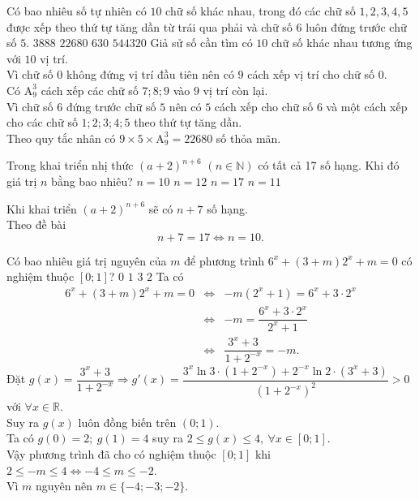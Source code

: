 \begin{ex}%
	Có bao nhiêu số tự nhiên có $10$ chữ số khác nhau, trong đó các chữ số $1,2,3,4,5$ được xếp theo thứ tự tăng dần từ trái qua phải và chữ số $6$ luôn đứng trước chữ số $5$.
	\choice
	{$3888$}
	{\True $22680$}
	{$630$}
	{$544320$}
	\loigiai
	{
		Giả sử số cần tìm có $10$ chữ số khác nhau tương ứng với $10$ vị trí.\\ Vì chữ số $0$ không đứng vị trí đầu tiên nên có $9$ cách xếp vị trí cho chữ số $0$.\\
		Có $\mathrm{A}_9^3$ cách xếp các chữ số $7;8;9$ vào $9$ vị trí còn lại.\\
		Vì chữ số $6$ đứng trước chữ số $5$ nên có $5$ cách xếp cho chữ số $6$ và một cách xếp cho các chữ số $1;2;3;4;5$ theo thứ tự tăng dần.\\
		Theo quy tắc nhân có $9\times5\times\mathrm{A}_9^3=22680$ số thỏa mãn.
	}
\end{ex}

\begin{ex}%
	Trong khai triển nhị thức $\left(a+2\right)^{n+6}$ $(n \in \mathbb{N})$ có tất cả 17 số hạng. Khi đó giá trị $n$ bằng bao nhiêu?
	\choice
	{\True $n=10$}
	{$n=12$}
	{$n=17$}
	{$n=11$}
	\loigiai
	{
		Khi khai triển $\left(a+2\right)^{n+6}$ sẽ có $n+7$ số hạng.\\
		Theo đề bài \[n+7=17 \Leftrightarrow n=10.\]
		
	}
\end{ex}

\begin{ex}%
	Có bao nhiêu giá trị nguyên của $m$ để phương trình $6^x+(3+m)2^x+m=0$ có nghiệm thuộc $[0;1]$?
	\choice
	{$0$}
	{$1$}
	{\True $3$}
	{$2$}
	\loigiai
	{
		Ta có
		\begin{eqnarray*}
			6^x+(3+m)2^x+m=0& \Leftrightarrow&  -m(2^x+1)=6^x+3\cdot2^x\\
			& \Leftrightarrow&  -m=\dfrac{6^x+3\cdot2^x}{2^x+1}\\
			& \Leftrightarrow&  \dfrac{3^x+3}{1+2^{-x}}=-m. 
		\end{eqnarray*}
		Đặt $g(x)=\dfrac{3^x+3}{1+2^{-x}}\Rightarrow g'(x)=\dfrac{3^x\ln 3\cdot(1+2^{-x})+2^{-x}\ln 2\cdot (3^x+3)}{(1+2^{-x})^2}>0$ với $\forall x \in \mathbb{R}$.\\
		Suy ra
		$g(x)$ luôn đồng biến trên $(0;1)$.\\
		Ta có $g(0)=2;~g(1)=4$ suy ra $2\le g(x)\le 4,~\forall  x\in [0;1]$.\\
		Vậy phương trình đã cho có nghiệm thuộc $[0;1]$ khi $2\le -m \le 4 \Leftrightarrow -4 \le m \le -2$.\\
		Vì $m$ nguyên nên $m\in\{-4;-3;-2\}$.
	}
\end{ex}


